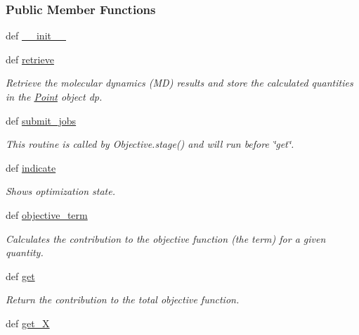 \subsubsection*{Public Member Functions}
\begin{DoxyCompactItemize}
\item 
def \hyperlink{classforcebalance_1_1gmxio_1_1Thermo__GMX_ae00af54760e055dfbafd288e2ce15cf0}{\-\_\-\-\_\-init\-\_\-\-\_\-}
\item 
def \hyperlink{classforcebalance_1_1thermo_1_1Thermo_a51a7c7849be08dbac153e8b2ff06afd8}{retrieve}
\begin{DoxyCompactList}\small\item\em Retrieve the molecular dynamics (M\-D) results and store the calculated quantities in the \hyperlink{classforcebalance_1_1thermo_1_1Point}{Point} object dp. \end{DoxyCompactList}\item 
def \hyperlink{classforcebalance_1_1thermo_1_1Thermo_a05ed95e5ac3c5b12048e6d928c5488b8}{submit\-\_\-jobs}
\begin{DoxyCompactList}\small\item\em This routine is called by Objective.\-stage() and will run before \char`\"{}get\char`\"{}. \end{DoxyCompactList}\item 
def \hyperlink{classforcebalance_1_1thermo_1_1Thermo_ae4c2b2c26951e2f72b40d39074d0979d}{indicate}
\begin{DoxyCompactList}\small\item\em Shows optimization state. \end{DoxyCompactList}\item 
def \hyperlink{classforcebalance_1_1thermo_1_1Thermo_a2578b390753ec351162dc429501b0760}{objective\-\_\-term}
\begin{DoxyCompactList}\small\item\em Calculates the contribution to the objective function (the term) for a given quantity. \end{DoxyCompactList}\item 
def \hyperlink{classforcebalance_1_1thermo_1_1Thermo_aa24e72e49064830a2ab069e6debb3dfa}{get}
\begin{DoxyCompactList}\small\item\em Return the contribution to the total objective function. \end{DoxyCompactList}\item 
def \hyperlink{classforcebalance_1_1target_1_1Target_a606dd136f195c267c05a2455405e5949}{get\-\_\-\-X}

\end{DoxyCompactItemize}
